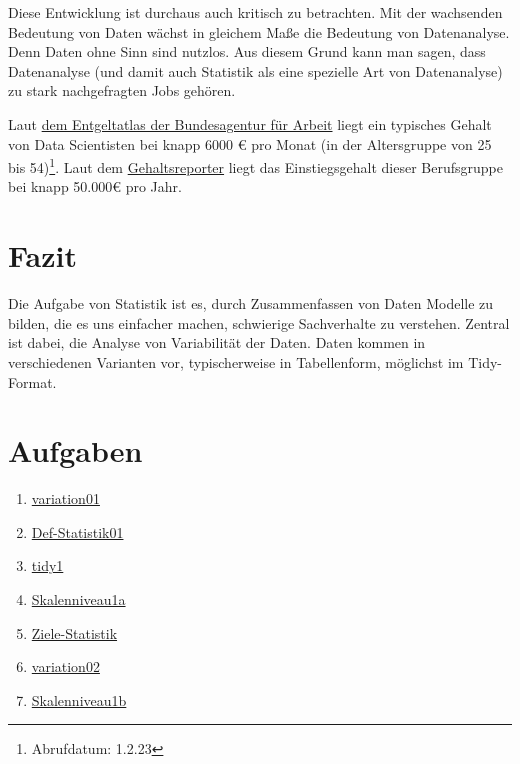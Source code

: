 \documentclass[
  a4paper,
  DIV=11]{scrreprt}
\providecommand{\tightlist}{%
  \setlength{\itemsep}{0pt}\setlength{\parskip}{0pt}}\usepackage{longtable,booktabs,array}
\theoremstyle{definition}
\theoremstyle{definition}
\theoremstyle{remark}
\begin{document}
Diese Entwicklung ist durchaus auch kritisch zu betrachten. Mit der
wachsenden Bedeutung von Daten wächst in gleichem Maße die Bedeutung von
Datenanalyse. Denn Daten ohne Sinn sind nutzlos. Aus diesem Grund kann
man sagen, dass Datenanalyse (und damit auch Statistik als eine
spezielle Art von Datenanalyse) zu stark nachgefragten Jobs gehören.

Laut \href{https://web.arbeitsagentur.de/entgeltatlas/beruf/129987}{dem
Entgeltatlas der Bundesagentur für Arbeit} liegt ein typisches Gehalt
von Data Scientisten bei knapp 6000 € pro Monat (in der Altersgruppe von
25 bis 54)\footnote{Abrufdatum: 1.2.23}. Laut dem
\href{https://gehaltsreporter.de/gehaelter-von-a-bis-z/it/data-scientist/}{Gehaltsreporter}
liegt das Einstiegsgehalt dieser Berufsgruppe bei knapp 50.000€ pro
Jahr.

\hypertarget{fazit}{%
\section{Fazit}\label{fazit}}

Die Aufgabe von Statistik ist es, durch Zusammenfassen von Daten Modelle
zu bilden, die es uns einfacher machen, schwierige Sachverhalte zu
verstehen. Zentral ist dabei, die Analyse von Variabilität der Daten.
Daten kommen in verschiedenen Varianten vor, typischerweise in
Tabellenform, möglichst im Tidy-Format.

\hypertarget{aufgaben}{%
\section{Aufgaben}\label{aufgaben}}

\begin{enumerate}
\def\labelenumi{\arabic{enumi}.}
\tightlist
\item
  \href{https://datenwerk.netlify.app/posts/variation01/variation01.html}{variation01}
\item
  \href{https://datenwerk.netlify.app/posts/def-statistik01/def-statistik01}{Def-Statistik01}
\item
  \href{https://datenwerk.netlify.app/posts/tidy1/tidy1.html}{tidy1}
\item
  \href{https://datenwerk.netlify.app/posts/skalenniveau1a/skalenniveau1a}{Skalenniveau1a}
\item
  \href{https://datenwerk.netlify.app/posts/ziele-statistik/ziele-statistik}{Ziele-Statistik}
\item
  \href{https://datenwerk.netlify.app/posts/variation02/variation02.html}{variation02}
\item
  \href{https://datenwerk.netlify.app/posts/skalenniveau1b/skalenniveau1b}{Skalenniveau1b}
\end{enumerate}
\end{document}

